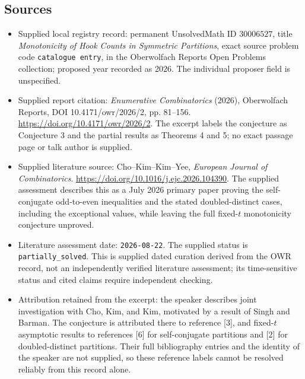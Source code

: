 \documentclass[11pt]{article}
\begin{document}
\subsection{Sources}
\begin{itemize}
\item Supplied local registry record: permanent UnsolvedMath ID \(30006527\), title \emph{Monotonicity of Hook Counts in Symmetric Partitions}, exact source problem code \texttt{catalogue entry}, in the Oberwolfach Reports Open Problems collection; proposed year recorded as 2026. The individual proposer field is unspecified.
\item Supplied report citation: \emph{Enumerative Combinatorics} (2026), Oberwolfach Reports, DOI 10.4171/owr/2026/2, pp. 81--156. \url{https://doi.org/10.4171/owr/2026/2}. The excerpt labels the conjecture as Conjecture 3 and the partial results as Theorems 4 and 5; no exact passage page or talk author is supplied.
\item Supplied literature source: Cho--Kim--Kim--Yee, \emph{European Journal of Combinatorics}. \url{https://doi.org/10.1016/j.ejc.2026.104390}. The supplied assessment describes this as a July 2026 primary paper proving the self-conjugate odd-to-even inequalities and the stated doubled-distinct cases, including the exceptional values, while leaving the full fixed-\(t\) monotonicity conjecture unproved.
\item Literature assessment date: \texttt{2026-08-22}. The supplied status is \texttt{partially\_solved}. This is supplied dated curation derived from the OWR record, not an independently verified literature assessment; its time-sensitive status and cited claims require independent checking.
\item Attribution retained from the excerpt: the speaker describes joint investigation with Cho, Kim, and Kim, motivated by a result of Singh and Barman. The conjecture is attributed there to reference [3], and fixed-\(t\) asymptotic results to references [6] for self-conjugate partitions and [2] for doubled-distinct partitions. Their full bibliography entries and the identity of the speaker are not supplied, so these reference labels cannot be resolved reliably from this record alone.
\end{itemize}
\end{document}
